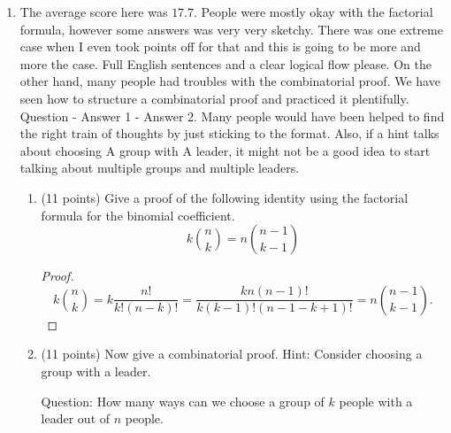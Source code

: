 \documentclass[12pt]{article}
\begin{document}
\begin{enumerate}
\begin{itemize}
This statement is also true. You could have done an if an only if proof (but then do BOTH directions) or write
\[
LHS= \{x\in A: x\notin B\cap C\}=\{x\in A:\neg ((x\in B)\wedge(x\in C))\}
\]
\[
=\{x\in A: \neg(x\in B)\vee \neg(x\in C)\}=\{x\in A: \neg (x\in B)\}\cup\{x\in A: \neg (x\in C)\}
\]
\[
=\{x\in A: x\notin B\}\cup\{x\in A: x\notin C\}=(A-B)\cup (A-C).
\]
\end{itemize}
\newpage
\item The average score here was $17.7$. People were mostly okay with the factorial formula, however some answers was very very sketchy. There was one extreme case when I even took points off for that and this is going to be more and more the case. Full English sentences and a clear logical flow please. On the other hand, many people had troubles with the combinatorial proof. We have seen how to structure a combinatorial proof and practiced it plentifully. Question - Answer 1 - Answer 2. Many people would have been helped to find the right train of thoughts by just sticking to the format. Also, if a hint talks about choosing A group with A leader, it might not be a good idea to start talking about multiple groups and multiple leaders.
\begin{enumerate}

\item (11 points) Give a proof of the following identity using the factorial formula for the binomial coefficient.
\[
k\binom{n}{k}=n\binom{n-1}{k-1}
\]

\begin{proof}
\[
k\binom{n}{k}=k\frac{n!}{k!(n-k)!}=\frac{kn(n-1)!}{k(k-1)!(n-1-k+1)!}=n\binom{n-1}{k-1}.
\]
\end{proof}

\item (11 points) Now give a combinatorial proof.
Hint: Consider choosing a group with a leader.

Question: How many ways can we choose a group of $k$ people with a leader out of $n$ people.


\end{enumerate}
\end{enumerate}
\end{document}
